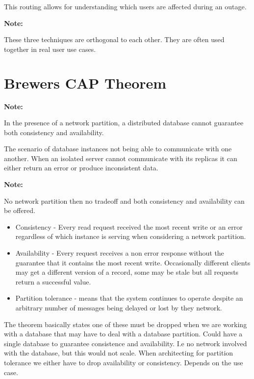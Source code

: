 \documentclass[a4paper, 11pt]{book}
\newenvironment{note}{
    \begin{siderule}
        \textbf{Note: }
        }{
    \end{siderule}}
\begin{document}
    This routing allows for understanding which users are affected during an outage.

    \begin{note}
        These three techniques are orthogonal to each other.
        They are often used together in real user use cases.
    \end{note}


    \section{Brewers CAP Theorem}

    \begin{note}
        In the presence of a network partition, a distributed database cannot guarantee both consistency and availability.
    \end{note}

    The scenario of database instances not being able to communicate with one another.
    When an isolated server cannot communicate with its replicas it can either return an error or produce inconsistent data.

    \begin{note}
        No network partition then no tradeoff and both consistency and availability can be offered.
    \end{note}

    \begin{itemize}
        \item Consistency - Every read request received the most recent write or an error regardless of which instance is serving when considering a network partition.
        \item Availability - Every request receives a non error response without the guarantee that it contains the most recent write.
        Occasionally different clients may get a different version of a record, some may be stale but all requests return a successful value.
        \item Partition tolerance - means that the system continues to operate despite an arbitrary number of messages being delayed or lost by they network.
    \end{itemize}

    The theorem basically states one of these must be dropped when we are working with a database that may have to deal with a database partition.
    Could have a single database to guarantee consistence and availability. I.e no network involved with the database, but this would not scale.
    When architecting for partition tolerance we either have to drop availability or consistency.
    Depends on the use case.
\end{document}
